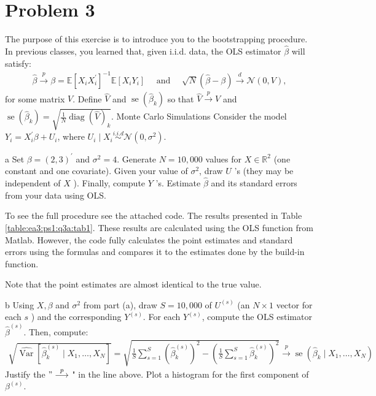 \documentclass{article}
\begin{document}
\newpage

\section*{Problem 3}
The purpose of this exercise is to introduce you to the bootstrapping procedure. In previous classes, you learned that, given i.i.d. data, the OLS estimator $\hat{\beta}$ will satisfy:
\begin{align*}
\hat{\beta} \stackrel{p}{\rightarrow} \beta=\mathbb{E}\left[X_{i} X_{i}^{\prime}\right]^{-1} \mathbb{E}\left[X_{i} Y_{i}\right] \quad \text { and } \quad \sqrt{N}(\hat{\beta}-\beta) \stackrel{d}{\rightarrow} \mathcal{N}(0, V),
\end{align*}
for some matrix $V$. Define $\hat{V}$ and $\operatorname{se}\left(\hat{\beta}_{k}\right)$ so that $\hat{V} \stackrel{p}{\rightarrow} V$ and $\operatorname{se}\left(\hat{\beta}_{k}\right)=\sqrt{\frac{1}{N} \operatorname{diag}(\hat{V})_{k}}$.
Monte Carlo Simulations
Consider the model $Y_{i}=X_{i}^{\prime} \beta+U_{i}$, where $U_{i} \mid X_{i} \stackrel{i . i . d}{\sim} \mathcal{N}\left(0, \sigma^{2}\right)$.
\begin{problem}{a}
Set $\beta=(2,3)^{\prime}$ and $\sigma^{2}=4$. Generate $N=10,000$ values for $X \in \mathbb{R}^{2}$ (one constant and one covariate). Given your value of $\sigma^{2}$, draw $U$ 's (they may be independent of $X$ ). Finally, compute $Y$ 's. Estimate $\hat{\beta}$ and its standard errors from your data using OLS.
\end{problem}
\begin{solution}
To see the full procedure see the attached code. The results presented in Table \ref{table:ea3:ps1:q3a:tab1}. These results are calculated using the OLS function from Matlab. However, the code fully calculates the point estimates and standard errors using the formulas and compares it to the estimates done by the build-in function. 

Note that the point estimates are almost identical to the true value. 
\end{solution}
\FloatBarrier
\begin{problem}{b}
Using $X, \beta$ and $\sigma^{2}$ from part (a), draw $S=10,000$ of $U^{(s)}$ (an $N \times 1$ vector for each $s$ ) and the corresponding $Y^{(s)}$. For each $Y^{(s)}$, compute the OLS estimator $\hat{\beta}^{(s)}$. Then, compute:
    \begin{align*}
        \sqrt{\widehat{\operatorname{Var}}\left[\hat{\beta}_{k}^{(s)} \mid X_{1}, \ldots, X_{N}\right]}=\sqrt{\frac{1}{S} \sum_{s=1}^{S}\left(\hat{\beta}_{k}^{(s)}\right)^{2}-\left(\frac{1}{S} \sum_{s=1}^{S} \hat{\beta}_{k}^{(s)}\right)^{2}} \stackrel{p}{\longrightarrow} \operatorname{se}\left(\hat{\beta}_{k} \mid X_{1}, \ldots, X_{N}\right)
    \end{align*}
    Justify the $" \stackrel{p}{\longrightarrow}$ " in the line above. Plot a histogram for the first component of $\beta^{(s)}$.
\end{problem}
\end{document}
